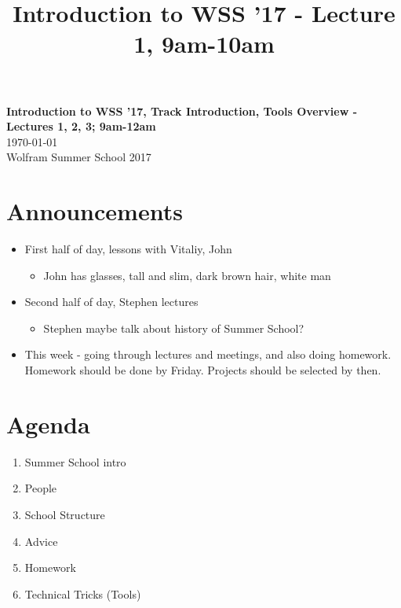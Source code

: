 \documentclass[11pt]{article}
\theoremstyle{definition}
\begin{document}
\title{Introduction to WSS '17 - Lecture 1, 9am-10am}

\thispagestyle{empty}
\begin{center}
{\LARGE \bf Introduction to WSS '17, Track Introduction, Tools Overview - Lectures 1, 2, 3; 9am-12am}\\
\medskip
{\Large \today}\\
\smallskip
{\large Wolfram Summer School 2017}
\end{center}

\section*{Announcements}
\begin{itemize}
\item First half of day, lessons with Vitaliy, John
\begin{itemize}
\item John has glasses, tall and slim, dark brown hair, white man
\end{itemize}
\item Second half of day, Stephen lectures
\begin{itemize}
\item Stephen maybe talk about history of Summer School?
\end{itemize}
\item This week - going through lectures and meetings, and also doing homework. Homework should be done by Friday. Projects should be selected by then.
\end{itemize}

\noindent\hrulefill



\section*{Agenda}
\begin{enumerate}
\item Summer School intro
\item People
\item School Structure
\item Advice
\item Homework
\item Technical Tricks (Tools)
\end{enumerate}
\end{document}
